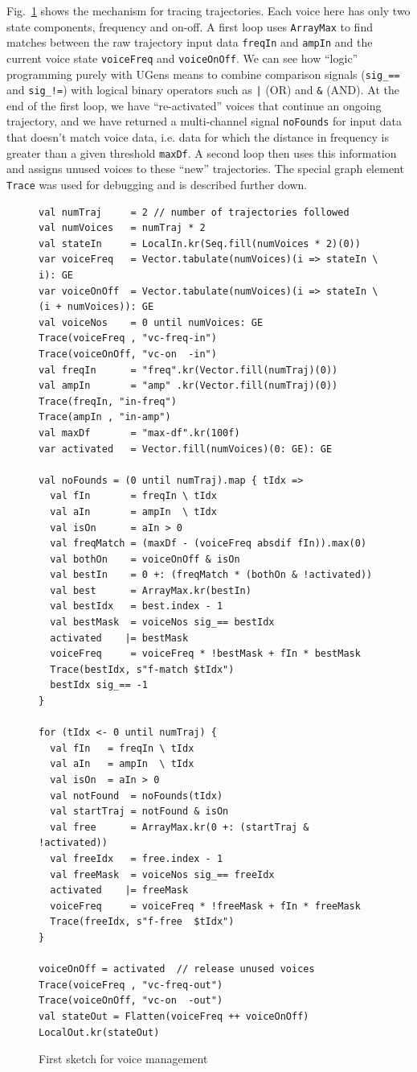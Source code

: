 \documentclass[11pt,a4paper]{article}
\newcommand{\figref}[1]{Fig.~\ref{#1}}
\begin{document}
\figref{fig:source-voice-traces} shows the mechanism for tracing trajectories. Each voice here has only two state components, frequency and on-off. A first loop uses \Verb!ArrayMax! to find matches between the raw trajectory input data \Verb!freqIn! and \Verb!ampIn! and the current voice state \Verb!voiceFreq! and \Verb!voiceOnOff!. We can see how ``logic'' programming purely with UGens means to combine comparison signals (\Verb!sig_==! and \Verb$sig_!=$) with logical binary operators such as \Verb!|! (OR) and \Verb!&! (AND). At the end of the first loop, we have ``re-activated'' voices that continue an ongoing trajectory, and we have returned a multi-channel signal \Verb!noFounds! for input data that doesn't match voice data, i.e. data for which the distance in frequency is greater than a given threshold \Verb!maxDf!. A second loop then uses this information and assigns unused voices to these ``new'' trajectories. The special graph element \Verb!Trace! was used for debugging and is described further down.

\begin{figure}%
\begin{lstlisting}[style=scala]
val numTraj     = 2	// number of trajectories followed
val numVoices   = numTraj * 2
val stateIn     = LocalIn.kr(Seq.fill(numVoices * 2)(0))
var voiceFreq   = Vector.tabulate(numVoices)(i => stateIn \ i): GE
var voiceOnOff  = Vector.tabulate(numVoices)(i => stateIn \ (i + numVoices)): GE
val voiceNos    = 0 until numVoices: GE
Trace(voiceFreq , "vc-freq-in")
Trace(voiceOnOff, "vc-on  -in")
val freqIn      = "freq".kr(Vector.fill(numTraj)(0))
val ampIn       = "amp" .kr(Vector.fill(numTraj)(0))
Trace(freqIn, "in-freq")
Trace(ampIn , "in-amp")
val maxDf       = "max-df".kr(100f)
var activated   = Vector.fill(numVoices)(0: GE): GE

val noFounds = (0 until numTraj).map { tIdx =>
  val fIn       = freqIn \ tIdx
  val aIn       = ampIn  \ tIdx
  val isOn      = aIn > 0
  val freqMatch = (maxDf - (voiceFreq absdif fIn)).max(0)
  val bothOn    = voiceOnOff & isOn
  val bestIn    = 0 +: (freqMatch * (bothOn & !activated))
  val best      = ArrayMax.kr(bestIn)
  val bestIdx   = best.index - 1
  val bestMask  = voiceNos sig_== bestIdx
  activated    |= bestMask
  voiceFreq     = voiceFreq * !bestMask + fIn * bestMask
  Trace(bestIdx, s"f-match $tIdx")
  bestIdx sig_== -1
}

for (tIdx <- 0 until numTraj) {
  val fIn   = freqIn \ tIdx
  val aIn   = ampIn  \ tIdx
  val isOn  = aIn > 0
  val notFound  = noFounds(tIdx)
  val startTraj = notFound & isOn
  val free      = ArrayMax.kr(0 +: (startTraj & !activated))
  val freeIdx   = free.index - 1
  val freeMask  = voiceNos sig_== freeIdx
  activated    |= freeMask
  voiceFreq     = voiceFreq * !freeMask + fIn * freeMask
  Trace(freeIdx, s"f-free  $tIdx")
}

voiceOnOff = activated  // release unused voices
Trace(voiceFreq , "vc-freq-out")
Trace(voiceOnOff, "vc-on  -out")
val stateOut = Flatten(voiceFreq ++ voiceOnOff)
LocalOut.kr(stateOut)
\end{lstlisting}%
\caption{First sketch for voice management}%
\label{fig:source-voice-traces}%
\end{figure}
\end{document}
